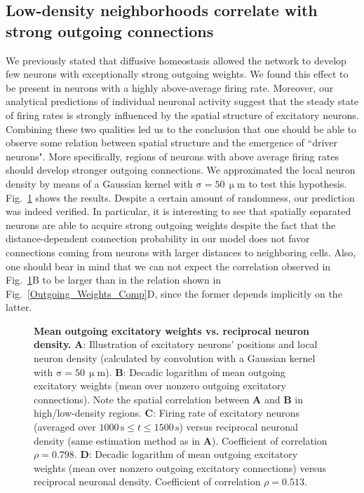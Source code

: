 \documentclass[10pt,letterpaper]{article}
\begin{document}
\subsection*{Low-density neighborhoods correlate with strong outgoing connections}
We previously stated that diffusive homeostasis allowed the network to develop few neurons with exceptionally strong outgoing weights. We found this effect to be present in neurons with a highly above-average firing rate. Moreover, our analytical predictions of individual neuronal activity suggest that the steady state of firing rates is strongly influenced by the spatial structure of excitatory neurons. Combining these two qualities led us to the conclusion that one should be able to observe some relation between spatial structure and the emergence of ``driver neurons". More specifically, regions of neurons with above average firing rates should develop stronger outgoing connections. We approximated the local neuron density by means of a Gaussian kernel with $\mathrm{\sigma = 50\, \upmu m}$ to test this hypothesis. Fig.~\ref{Inverse_Dens_vs_Sum_Out_Weights} shows the results. Despite a certain amount of randomness, our prediction was indeed verified. In particular, it is interesting to see that spatially separated neurons are able to acquire strong outgoing weights despite the fact that the distance-dependent connection probability in our model does not favor connections coming from neurons with larger distances to neighboring cells. Also, one should bear in mind that we can not expect the correlation observed in Fig.~\ref{Inverse_Dens_vs_Sum_Out_Weights}B to be larger than in the relation shown in Fig.~\ref{Outgoing_Weights_Comp}D, since the former depends implicitly on the latter.
\begin{figure}
\caption{{\bf Mean outgoing excitatory weights vs. reciprocal neuron density.} \textbf{A}: Illustration of excitatory neurons' positions and local neuron density (calculated by convolution with a Gaussian kernel with $\mathrm{\sigma = 50\, \upmu m}$). \textbf{B}: Decadic logarithm of mean outgoing excitatory weights (mean over nonzero outgoing excitatory connections). Note the spatial correlation between \textbf{A} and \textbf{B} in high/low-density regions. \textbf{C}: Firing rate of excitatory neurons (averaged over $\mathrm{ 1000\,s} \leq t \mathrm{\leq 1500\,s}$) versus reciprocal neuronal density (same estimation method as in \textbf{A}). Coefficient of correlation $\rho = 0.798$. \textbf{D}: Decadic logarithm of mean outgoing excitatory weights (mean over nonzero outgoing excitatory connections) versus reciprocal neuronal density. Coefficient of correlation $\rho = 0.513$.}
\label{Inverse_Dens_vs_Sum_Out_Weights}
\end{figure}
\end{document}
